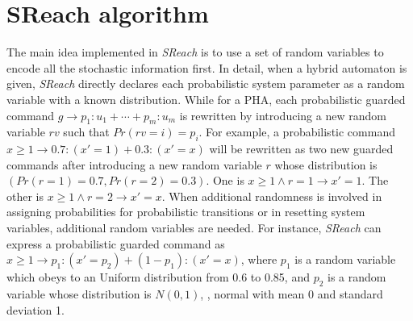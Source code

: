 \section{SReach algorithm}
The main idea implemented in {\it SReach} is to use a set of random variables to encode all the stochastic information first. In detail, when a hybrid automaton is given, {\it SReach} directly declares each probabilistic system parameter as a random variable with a known distribution. While for a PHA, each probabilistic guarded command $g \rightarrow p_1:u_1 + \cdots + p_m:u_m$ is rewritten by introducing a new random variable $rv$ such that $Pr(rv = i) = p_i$. For example, a probabilistic command $x \geq 1 \to 0.7 : (x' = 1)+ 0.3 :( x' = x)$ will be rewritten as two new guarded commands after introducing a new random variable $r$ whose distribution is $(Pr(r=1)=0.7, Pr(r=2)=0.3)$. One is $x \geq 1 \wedge r = 1 \to x'=1$. The other is $x \geq 1 \wedge r = 2 \to x'=x$. When additional randomness is involved in assigning probabilities for probabilistic transitions or in resetting system variables, additional random variables are needed. For instance, {\it SReach} can express a probabilistic guarded command as $x \geq 1 \to p_1 : (x' = p_2 )+ (1-p_1) :( x' = x)$, where $p_1$ is a random variable which obeys to an Uniform distribution from 0.6 to 0.85, and $p_2$ is a random variable whose distribution is $N(0,1)$, \ie, normal with mean 0 and standard deviation 1.

